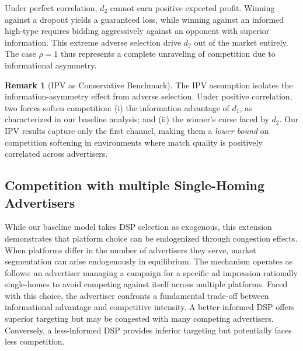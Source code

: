 \documentclass[11pt]{article}
\theoremstyle{plain}
\theoremstyle{definition}
\newtheorem{rem}[thm]{Remark}
\theoremstyle{plain}
\theoremstyle{plain}
\theoremstyle{plain}
\theoremstyle{plain}
\numberwithin{equation}{section}
\begin{document}
\noindent Under perfect correlation, $d_2$ cannot earn positive expected profit. Winning against a dropout yields a guaranteed loss, while winning against an informed high-type requires bidding aggressively against an opponent with superior information. This extreme adverse selection drive $d_2$ out of the market entirely. The case $\rho = 1$ thus represents a complete unraveling of competition due to informational asymmetry.

\vspace{0.2cm}

\begin{rem}[IPV as Conservative Benchmark]
The IPV assumption isolates the information-asymmetry effect from adverse selection. Under positive correlation, two forces soften competition: (i) the information advantage of $d_1$, as characterized in our baseline analysis; and (ii) the winner's curse faced by $d_2$. Our IPV results capture only the first channel, making them a \emph{lower bound} on competition softening in environments where match quality is positively correlated across advertisers.
\end{rem}
\vspace{0.4cm} 
\subsection{Competition with multiple Single-Homing Advertisers}\label{multiple-ADV}
\noindent While our baseline model takes DSP selection as exogenous, this extension demonstrates that platform choice can be endogenized through congestion effects. When platforms differ in the number of advertisers they serve, market segmentation can arise endogenously in equilibrium. The mechanism operates as follows: an advertiser managing a campaign for a specific ad impression rationally single-homes to avoid competing against itself across multiple platforms. Faced with this choice, the advertiser confronts a fundamental trade-off between informational advantage and competitive intensity. A better-informed DSP offers superior targeting but may be congested with many competing advertisers. Conversely, a less-informed DSP provides inferior targeting but potentially faces less competition.

\vspace{0.2cm}
\end{document}
